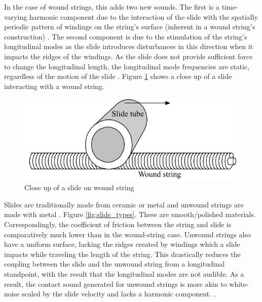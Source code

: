 \documentclass[main.tex]{subfiles}
\begin{document}
In the case of wound strings, this adds two new sounds. The first is a time-varying harmonic component due to the interaction of the slide with the spatially periodic pattern of windings on the string’s surface (inherent in a wound string’s construction) . The second component is due to the stimulation of the string’s longitudinal modes as the slide introduces disturbances in this direction when it impacts the ridges of the windings. As the slide does not provide sufficient force to change the longitudinal length, the longitudinal mode frequencies are static, regardless of the motion of the slide . Figure \ref{fig:slide_string_zoom} shows a close up of a slide interacting with a wound string.

\begin{figure}[h]
    \centering
    \includegraphics[scale=1]{./images/pictures/slide_wound_string_zoom.PNG}
    \caption{Close up of a slide on wound string}
    \label{fig:slide_string_zoom}
\end{figure}

Slides are traditionally made from ceramic or metal and unwound strings are made with metal . Figure \ref{fig:slide_types}. These are smooth/polished materials. Correspondingly, the coefficient of friction between the string and slide is comparatively much lower than in the wound-string case. Unwound strings also have a uniform surface, lacking the ridges created by windings which a slide impacts while traveling the length of the string. This drastically reduces the coupling between the slide and the unwound string from a longitudinal standpoint, with the result that the longitudinal modes are not audible. As a result, the contact sound generated for unwound strings is more akin to white-noise scaled by the slide velocity and lacks a harmonic component. . 
\end{document}
